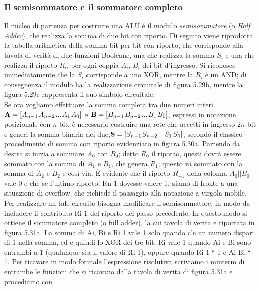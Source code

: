 \documentclass[a4paper]{extarticle}
\begin{document}
\subsubsection{Il semisommatore e il sommatore completo}
Il nucleo di partenza per costruire una ALU è il modulo \textit{semisommatore} (o \textit{Half Adder}), che realizza la somma di due bit con riporto. Di seguito viene riprodotta la tabella aritmetica della somma bit per bit con riporto, che corrisponde alla tavola di verità di due funzioni Booleane, una che realizza la somma \(S_i\) e una che realizza il riporto \(R_i\), per ogni coppia \(A_i\), \(B_i\) dei bit d’ingresso. Si riconosce immediatamente che la \(S_i\) corrisponde a uno XOR, mentre la \(R_i\) è un AND; di conseguenza il modulo ha la realizzazione circuitale di figura 5.29b, mentre la
figura 5.29c rappresenta il suo simbolo circuitale.\\
Se ora vogliamo effettuare la somma completa tra due numeri interi \(\textbf{A} = \left[ A_{n - 1} \hspace{0.1em} A_{n - 2} \hspace{0.1em} ... \hspace{0.1em} A_1 \hspace{0.1em} A_0 \right]\) e \(\textbf{B} = \left[ B_{n - 1} \hspace{0.1em} B_{n - 2} \hspace{0.1em} ... \hspace{0.1em} B_1 \hspace{0.1em} B_0 \right]\), espressi in notazione posizionale con \(n\) bit, è necessario costruire una rete che accetti in ingresso \(2n\) bit e generi la somma binaria dei due,\(\textbf{S} = \left[ S_{n - 1} \hspace{0.1em} S_{n - 2} \hspace{0.1em} ... \hspace{0.1em} S_1 \hspace{0.1em} S_0 \right]\), secondo il classico procedimento di somma con riporto evidenziato in figura 5.30a. Partendo da destra si inizia a sommare \(A_0\) con \(B_0\); detto \(R_0\) il riporto, questi dovrà essere sommato con la somma di \(A_1\) e \(B_1\), che genera \(R_1\); questo va sommato con la somma di \(A_2\) e \(B_2\) e così via. È evidente che il riporto \(R_{-1}\) della colonna \(A_0 || B_0\) vale \(0\) e che se l’ultimo riporto, Rn 1
dovesse valere 1, siamo di fronte a una situazione di overflow, che richiede il passaggio alla notazione a virgola
mobile. Per realizzare un tale circuito bisogna modificare il semisommatore, in modo da includere il contributo
Ri 1 del riporto del passo precedente. In questo modo si ottiene il sommatore completo (o full adder), la cui
tavola di verita  e riportata in figura 5.31a. La somma di   Ai, Bi e Ri 1 vale 1 solo quando c’e un numero dispari
di 1 nella somma, ed e quindi lo XOR dei tre bit;   Ri vale 1 quando Ai e Bi sono entrambi a 1 (qualunque sia il
valore di Ri 1), oppure quando Ri 1 “ 1 e Ai   Bi “ 1. Per ricavare in modo formale l’espressione risolutiva
scriviamo i minterm di entrambe le funzioni che si ricavano dalla tavola di verita di figura 5.31a e procediamo con
\end{document}
